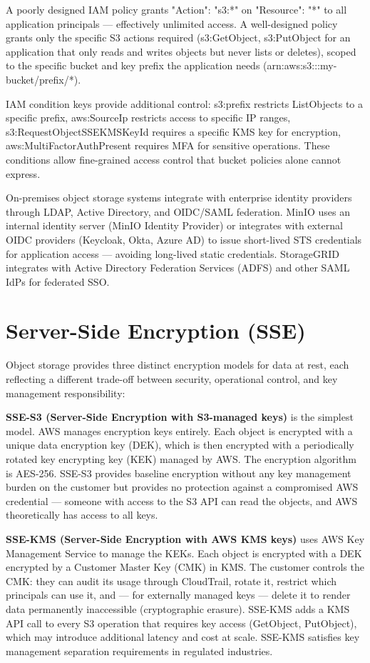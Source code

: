A poorly designed IAM policy grants "Action": "s3:*" on "Resource": "*" to all application principals --- effectively unlimited access. A well-designed policy grants only the specific S3 actions required (s3:GetObject, s3:PutObject for an application that only reads and writes objects but never lists or deletes), scoped to the specific bucket and key prefix the application needs (arn:aws:s3:::my-bucket/prefix/*).

IAM condition keys provide additional control: s3:prefix restricts ListObjects to a specific prefix, aws:SourceIp restricts access to specific IP ranges, s3:RequestObjectSSEKMSKeyId requires a specific KMS key for encryption, aws:MultiFactorAuthPresent requires MFA for sensitive operations. These conditions allow fine-grained access control that bucket policies alone cannot express.

On-premises object storage systems integrate with enterprise identity providers through LDAP, Active Directory, and OIDC/SAML federation. MinIO uses an internal identity server (MinIO Identity Provider) or integrates with external OIDC providers (Keycloak, Okta, Azure AD) to issue short-lived STS credentials for application access --- avoiding long-lived static credentials. StorageGRID integrates with Active Directory Federation Services (ADFS) and other SAML IdPs for federated SSO.

\section{Server-Side Encryption (SSE)}
Object storage provides three distinct encryption models for data at rest, each reflecting a different trade-off between security, operational control, and key management responsibility:

\textbf{SSE-S3 (Server-Side Encryption with S3-managed keys)} is the simplest model. AWS manages encryption keys entirely. Each object is encrypted with a unique data encryption key (DEK), which is then encrypted with a periodically rotated key encrypting key (KEK) managed by AWS. The encryption algorithm is AES-256. SSE-S3 provides baseline encryption without any key management burden on the customer but provides no protection against a compromised AWS credential --- someone with access to the S3 API can read the objects, and AWS theoretically has access to all keys.

\textbf{SSE-KMS (Server-Side Encryption with AWS KMS keys)} uses AWS Key Management Service to manage the KEKs. Each object is encrypted with a DEK encrypted by a Customer Master Key (CMK) in KMS. The customer controls the CMK: they can audit its usage through CloudTrail, rotate it, restrict which principals can use it, and --- for externally managed keys --- delete it to render data permanently inaccessible (cryptographic erasure). SSE-KMS adds a KMS API call to every S3 operation that requires key access (GetObject, PutObject), which may introduce additional latency and cost at scale. SSE-KMS satisfies key management separation requirements in regulated industries.

